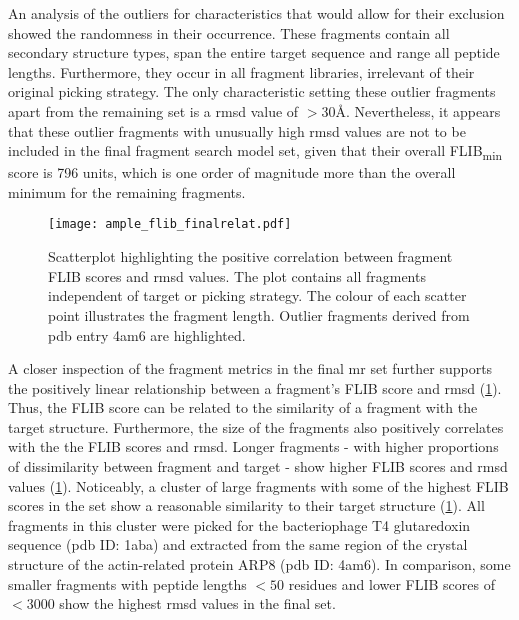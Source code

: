 An analysis of the outliers for characteristics that would allow for their exclusion showed the randomness in their occurrence. These fragments contain all secondary structure types, span the entire target sequence and range all peptide lengths. Furthermore, they occur in all fragment libraries, irrelevant of their original picking strategy. The only characteristic setting these outlier fragments apart from the remaining set is a \gls{rmsd} value of $>30$\AA. Nevertheless, it appears that these outlier fragments with unusually high \gls{rmsd} values are not to be included in the final fragment search model set, given that their overall FLIB\textsubscript{min} score is 796 units, which is one order of magnitude more than the overall minimum for the remaining fragments.

\begin{figure}[H]
	\centering
	\texttt{[image: ample\_flib\_finalrelat.pdf]}
	\caption[Correlation analysis for final FLIB \gls{mr} fragments]{Scatterplot highlighting the positive correlation between fragment FLIB scores and \gls{rmsd} values. The plot contains all fragments independent of target or picking strategy. The colour of each scatter point illustrates the fragment length. Outlier fragments derived from \gls{pdb} entry 4am6 are highlighted.}
	\label{fig:ample_flib_finalrelat}
\end{figure}

A closer inspection of the fragment metrics in the final \gls{mr} set further supports the positively linear relationship between a fragment's FLIB score and \gls{rmsd} (\cref{fig:ample_flib_finalrelat}). Thus, the FLIB score can be related to the similarity of a fragment with the target structure. Furthermore, the size of the fragments also positively correlates with the the FLIB scores and \gls{rmsd}. Longer fragments - with higher proportions of dissimilarity between fragment and target - show higher FLIB scores and \gls{rmsd} values (\cref{fig:ample_flib_finalrelat}). Noticeably, a cluster of large fragments with some of the highest FLIB scores in the set show a reasonable similarity to their target structure (\cref{fig:ample_flib_finalrelat}). All fragments in this cluster were picked for the bacteriophage T4 glutaredoxin sequence (\gls{pdb} ID: 1aba) and extracted from the same region of the crystal structure of the actin-related protein ARP8 (\gls{pdb} ID: 4am6). In comparison, some smaller fragments with peptide lengths $<50$ residues and lower FLIB scores of $<3000$ show the highest \gls{rmsd} values in the final set.

